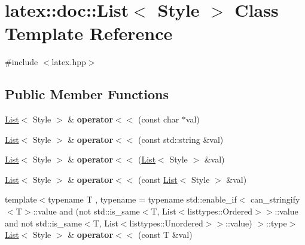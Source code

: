 \hypertarget{classlatex_1_1doc_1_1List}{\section{latex\-:\-:doc\-:\-:\-List$<$ \-Style $>$ \-Class \-Template \-Reference}
\label{classlatex_1_1doc_1_1List}
}


{\ttfamily \#include $<$latex.\-hpp$>$}

\subsection*{\-Public \-Member \-Functions}
\begin{DoxyCompactItemize}
\item 
\hypertarget{classlatex_1_1doc_1_1List_afd9fcb1586fd4103801d68345dc3d961}{\hyperlink{classlatex_1_1doc_1_1List}{\-List}$<$ \-Style $>$ \& {\bfseries operator$<$$<$} (const char $\ast$val)}\label{classlatex_1_1doc_1_1List_afd9fcb1586fd4103801d68345dc3d961}

\item 
\hypertarget{classlatex_1_1doc_1_1List_a403fcb27a8d89d845ca609caf2d130ac}{\hyperlink{classlatex_1_1doc_1_1List}{\-List}$<$ \-Style $>$ \& {\bfseries operator$<$$<$} (const std\-::string \&val)}\label{classlatex_1_1doc_1_1List_a403fcb27a8d89d845ca609caf2d130ac}

\item 
\hypertarget{classlatex_1_1doc_1_1List_ad269a03ad06439356e17c86582b03297}{\hyperlink{classlatex_1_1doc_1_1List}{\-List}$<$ \-Style $>$ \& {\bfseries operator$<$$<$} (\hyperlink{classlatex_1_1doc_1_1List}{\-List}$<$ \-Style $>$ \&val)}\label{classlatex_1_1doc_1_1List_ad269a03ad06439356e17c86582b03297}

\item 
\hypertarget{classlatex_1_1doc_1_1List_af2f4cbc14d4001b7e185392d8cddf9e8}{\hyperlink{classlatex_1_1doc_1_1List}{\-List}$<$ \-Style $>$ \& {\bfseries operator$<$$<$} (const \hyperlink{classlatex_1_1doc_1_1List}{\-List}$<$ \-Style $>$ \&val)}\label{classlatex_1_1doc_1_1List_af2f4cbc14d4001b7e185392d8cddf9e8}

\item 
\hypertarget{classlatex_1_1doc_1_1List_a9a5ed93557cd28c325cec55fcf74c76c}{{\footnotesize template$<$typename T , typename  = typename std\-::enable\-\_\-if$<$                can\-\_\-stringify$<$\-T$>$\-::value                and                (not std\-::is\-\_\-same$<$\-T, List$<$listtypes\-::\-Ordered$>$$>$\-::value and not std\-::is\-\_\-same$<$\-T, List$<$listtypes\-::\-Unordered$>$$>$\-::value)            $>$\-::type$>$ }\\\hyperlink{classlatex_1_1doc_1_1List}{\-List}$<$ \-Style $>$ \& {\bfseries operator$<$$<$} (const \-T \&val)}\label{classlatex_1_1doc_1_1List_a9a5ed93557cd28c325cec55fcf74c76c}


\end{DoxyCompactItemize}
